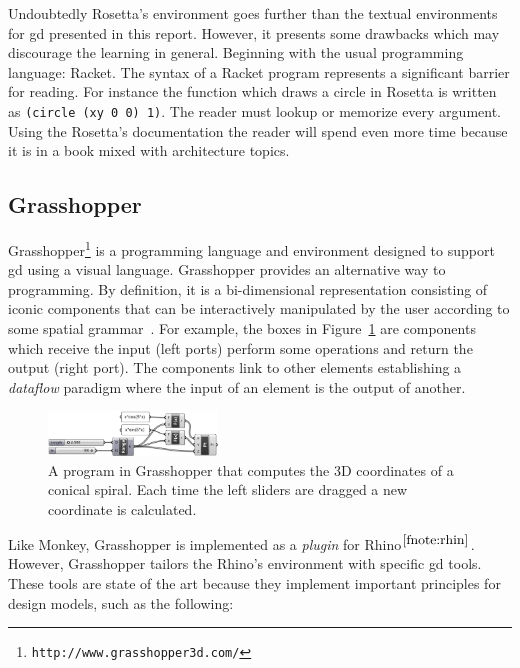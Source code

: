 Undoubtedly Rosetta's environment goes further than the textual environments for \gls{gd} presented in this report. However, it presents some drawbacks which may discourage the learning in general. Beginning with the usual programming language: Racket. The syntax of a Racket program represents a significant barrier for reading. For instance the function which draws a circle in Rosetta is written as \texttt{(circle (xy 0 0) 1)}. The reader must lookup or memorize every argument. Using the Rosetta's documentation the reader will spend even more time because it is in a book mixed with architecture topics.
\subsection{Grasshopper}
\label{subsec:grasshopper}
Grasshopper\footnote{\texttt{http://www.grasshopper3d.com/}} is a programming language and environment designed to support \gls{gd} using a visual language. Grasshopper provides an alternative way to programming. By definition, it is a bi-dimensional representation consisting of iconic components that can be interactively manipulated by the user according to some spatial grammar~\cite{myers1990taxonomies}. For example, the boxes in Figure~\ref{fig:grass} are components which receive the input (left ports) perform some operations and return the output (right port). The components link to other elements establishing a \textit{dataflow} paradigm where the input of an element is the output of another.

\begin{figure}[!htbp]
  \centering
  \includegraphics[width=0.4\textwidth]{images/grasshopper}
    \caption{A program in Grasshopper that computes the 3D coordinates of a conical spiral. Each time the left sliders are dragged a new coordinate is calculated.}
  \label{fig:grass}
\end{figure}

Like Monkey, Grasshopper is implemented as a \textit{plugin} for Rhino$^{\ref{fnote:rhin}}$. However, Grasshopper tailors the Rhino's environment with specific \gls{gd} tools. These tools are state of the art because they implement important principles for design models, such as the following:

